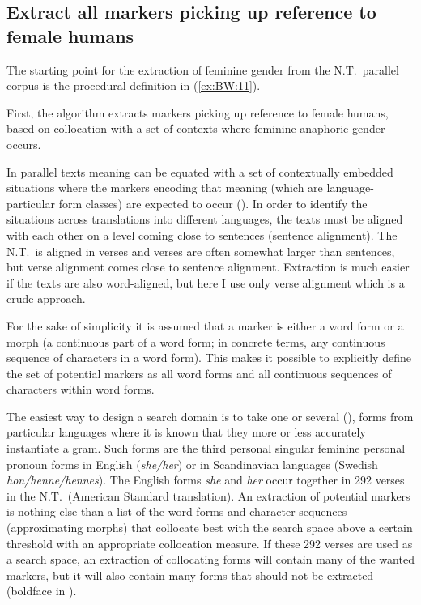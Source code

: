 \documentclass[output=collectionpaper]{langsci/langscibook}
\begin{document}
\subsection{Extract all markers picking up reference to female humans}
\label{sec:BW:3.2}

The starting point for the extraction of feminine gender from the N.T.\ parallel corpus is the procedural definition in (\ref{ex:BW:11}).

First, the algorithm extracts markers picking up reference to female humans, based on collocation with a set of contexts where feminine anaphoric gender occurs.

In parallel texts meaning can be equated with a set of contextually embedded situations where the markers encoding that meaning (which are language-particular form classes) are expected to occur (\citealt[672]{Waelchli2012}). In order to identify the situations across translations into different languages, the texts must be aligned with each other on a level coming close to sentences (sentence alignment). The N.T.\ is aligned in verses and verses are often somewhat larger than sentences, but verse alignment comes close to sentence alignment. Extraction is much easier if the texts are also word-aligned, but here I use only verse alignment which is a crude approach.

For the sake of simplicity it is assumed that a marker is either a word form or a morph (a continuous part of a word form; in concrete terms, any continuous sequence of characters in a word form). This makes it possible to explicitly define the set of potential markers as all word forms and all continuous sequences of characters within word forms.

The easiest way to design a search domain is to take one or several  (\citealt{Dahl2016}), forms from particular languages where it is known that they more or less accurately instantiate a gram. Such forms are the third personal singular feminine personal pronoun forms in English (\textit{she/her}) or in Scandinavian languages (Swedish \textit{hon/henne/hennes}). The English forms \textit{she} and \textit{her} occur together in 292 verses in the N.T.\ (American Standard translation). An extraction of potential markers is nothing else than a list of the word forms and character sequences (approximating morphs) that collocate best with the search space above a certain threshold with an appropriate collocation measure. If these 292 verses are used as a search space, an extraction of collocating forms will contain many of the wanted markers, but it will also contain many forms that should not be extracted (boldface in ).
\end{document}
